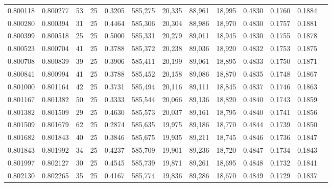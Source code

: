 \begin{tabular}{rrrrrrrrrrrrr}
0.800118 & 0.800277 &    53 &  25 &                                     0.3205 & 585,275 &  20,335 &  88,961 &  18,995 & 0.4830 & 0.1760 & 0.1884 \\
0.800280 & 0.800394 &    31 &  25 &                                     0.4464 & 585,306 &  20,304 &  88,986 &  18,970 & 0.4830 & 0.1757 & 0.1881 \\
0.800399 & 0.800518 &    25 &  25 &                                     0.5000 & 585,331 &  20,279 &  89,011 &  18,945 & 0.4830 & 0.1755 & 0.1878 \\
0.800523 & 0.800704 &    41 &  25 &                                     0.3788 & 585,372 &  20,238 &  89,036 &  18,920 & 0.4832 & 0.1753 & 0.1875 \\
0.800708 & 0.800839 &    39 &  25 &                                     0.3906 & 585,411 &  20,199 &  89,061 &  18,895 & 0.4833 & 0.1750 & 0.1871 \\
0.800841 & 0.800994 &    41 &  25 &                                     0.3788 & 585,452 &  20,158 &  89,086 &  18,870 & 0.4835 & 0.1748 & 0.1867 \\
0.801000 & 0.801164 &    42 &  25 &                                     0.3731 & 585,494 &  20,116 &  89,111 &  18,845 & 0.4837 & 0.1746 & 0.1863 \\
0.801167 & 0.801382 &    50 &  25 &                                     0.3333 & 585,544 &  20,066 &  89,136 &  18,820 & 0.4840 & 0.1743 & 0.1859 \\
0.801382 & 0.801509 &    29 &  25 &                                     0.4630 & 585,573 &  20,037 &  89,161 &  18,795 & 0.4840 & 0.1741 & 0.1856 \\
0.801509 & 0.801679 &    62 &  25 &                                     0.2874 & 585,635 &  19,975 &  89,186 &  18,770 & 0.4844 & 0.1739 & 0.1850 \\
0.801682 & 0.801843 &    40 &  25 &                                     0.3846 & 585,675 &  19,935 &  89,211 &  18,745 & 0.4846 & 0.1736 & 0.1847 \\
0.801843 & 0.801992 &    34 &  25 &                                     0.4237 & 585,709 &  19,901 &  89,236 &  18,720 & 0.4847 & 0.1734 & 0.1843 \\
0.801997 & 0.802127 &    30 &  25 &                                     0.4545 & 585,739 &  19,871 &  89,261 &  18,695 & 0.4848 & 0.1732 & 0.1841 \\
0.802130 & 0.802265 &    35 &  25 &                                     0.4167 & 585,774 &  19,836 &  89,286 &  18,670 & 0.4849 & 0.1729 & 0.1837 \\

\end{tabular}
